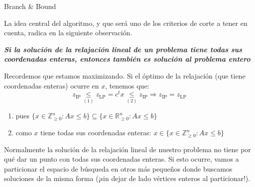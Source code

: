 \documentclass[10pt, aspectratio=169]{beamer}
\begin{document}


\begin{frame}{Branch \& Bound}

	La idea central del algoritmo, y que ser\'a uno de los criterios de corte a tener en cuenta, radica en la siguiente observaci\'on. 
	\pause
	
	\textsl{\textbf{Si la soluci\'on de la relajaci\'on lineal de un problema tiene todas sus coordenadas enteras, entonces tambi\'en es soluci\'on al problema entero}}
	\pause
	
	Recordemos que estamos maximizando. Si el \'optimo de la relajaci\'on (que tiene coordenadas enteras) ocurre en $x$, tenemos que: 
	$$z_{\text{IP}} \underset{(1)}{\leq} z_{\text{LP}} = c^tx \underset{(2)}{\leq} z_{\text{IP}} \Rightarrow z_{\text{IP}} = z_{\text{LP}}	$$

    \pause

    \begin{enumerate}
        \item[(1)] pues $\{x \in \mathbb{Z}^n_{\geq 0}\colon Ax \leq b\} \subseteq \{x \in \mathbb{R}^n_{\geq 0}\colon Ax \leq b\}$
        \item[(2)] como $x$ tiene todas sus coordenadas enteras:  $x\in \{x \in \mathbb{Z}^n_{\geq 0}\colon Ax \leq b\}$
    \end{enumerate}
 
	\pause
	Normalmente la soluci\'on de la relajaci\'on lineal de nuestro problema no tiene por qu\'e dar un punto con todas sus coordenadas enteras. 
	Si esto ocurre, vamos a particionar el espacio de b\'usqueda en otros m\'as pequeños donde buscamos soluciones de la misma forma (¡sin dejar de lado v\'ertices enteros al particionar!).
	
\end{frame}
\end{document}
